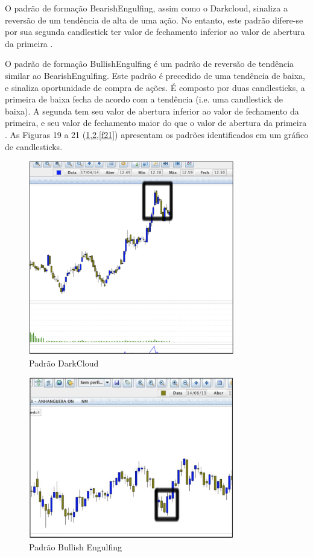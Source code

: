 O padrão de formação BearishEngulfing, assim como o Darkcloud, sinaliza a reversão de um tendência de alta de uma ação. No entanto, este padrão difere-se por sua segunda candlestick ter valor de fechamento inferior ao valor de abertura da primeira \cite[p. 38]{bigalow2010}.

O padrão de formação BullishEngulfing é um padrão de reversão de tendência similar ao BearishEngulfing. Este padrão é precedido de uma tendência de baixa, e sinaliza oportunidade de compra de ações. É composto por duas candlesticks, a primeira de baixa fecha de acordo com a tendência (i.e. uma candlestick de baixa). A segunda tem seu valor de abertura inferior ao valor de fechamento da primeira, e seu valor de fechamento maior do que o valor de abertura da primeira \cite[p. 36]{bigalow2010}. As Figuras 19 a 21 (\ref{f19},\ref{f20},\ref{f21}) apresentam os padrões identificados em um gráfico de candlesticks.

\begin{figure}[h]
\centering
\label{f19}
\includegraphics[width=0.8\textwidth]{figuras/f19}
\caption{Padrão DarkCloud}
\end{figure}

\begin{figure}[h]
\centering
\label{f20}
\includegraphics[width=0.8\textwidth]{figuras/f20}
\caption{Padrão Bullish Engulfing}
\end{figure}

